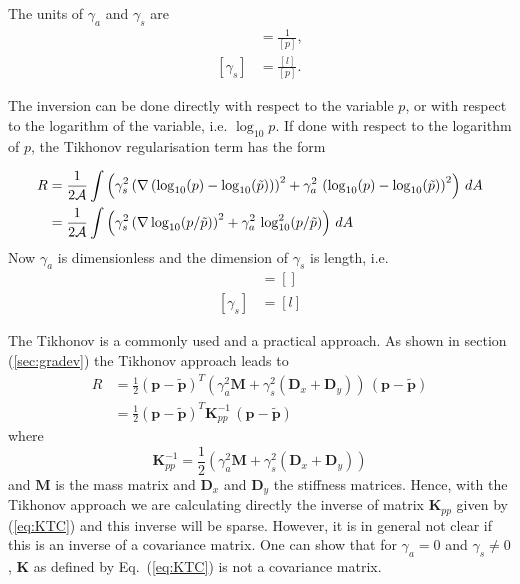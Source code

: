 \documentclass[10pt,a4paper]{book}
\begin{document}
The units of $\gamma_a$ and $\gamma_s$ are 
\begin{align*}
[\gamma_a] &= \frac{1}{[p]} , \\
[\gamma_s] &= \frac{[l]}{[p]}  .
\end{align*}

The inversion can be done directly with respect to the variable $p$,
or with respect to the logarithm of the variable, i.e.  $\log_{10}
p$. If done with respect to the logarithm of $p$, the Tikhonov
regularisation term has the form

\begin{align}
R & =  \frac{1}{2\cal{A}} \int \left ( \gamma_s^2   \left ( \nabla \left ( \log_{10}(p) - \log_{10}(\tilde{p}) \right ) \right )^2 + \gamma_a^2 \, \left (\log_{10}(p)-\log_{10}(\tilde{p}) \right )^2 \right ) \, dA \nonumber \\
  & =  \frac{1}{2\cal{A}} \int \left ( \gamma_s^2  \left ( \nabla   \log_{10}(p/\tilde{p}) \right )^2   + \gamma_a^2 \,  \log_{10}^2(p/\tilde{p})  \right ) \, dA 
\label{eq:TRlog1}
\end{align}
Now $\gamma_a$ is dimensionless and the dimension of $\gamma_s$ is length, i.e. 
\begin{align*}
[\gamma_a] &= [] \\
[\gamma_s] &= [l]
\end{align*}





The Tikhonov is a commonly used and a practical approach. As shown in
section (\ref{sec:gradev}) the Tikhonov approach leads to
\begin{align}
R  &= \frac{1}{2} (\bm{p}-\tilde{\bm{p}})^T \left ( \gamma_a^2 \bm{M}  +  \gamma_s^2 (\bm{D}_x + \bm{D}_y) \right ) \, ( \bm{p}-\tilde{\bm{p}}) \\
   &= \frac{1}{2} (\bm{p}-\tilde{\bm{p}})^T \bm{K}^{-1}_{pp} \, ( \bm{p}-\tilde{\bm{p}})
\end{align}
where
\begin{equation}
\bm{K}^{-1}_{pp} = \frac{1}{2}  \left ( \gamma_a^2 \bm{M} +  \gamma^2_s(\bm{D}_x + \bm{D}_y) \right )
\label{eq:KTC}
\end{equation}
and $\bm{M}$ is the mass matrix and $\bm{D}_x$ and $\bm{D}_y$ the
stiffness matrices. Hence, with the Tikhonov approach we are
calculating directly the inverse of matrix $\bm{K}_{pp}$ given by
(\ref{eq:KTC}) and this inverse will be sparse. However, it is in
general not clear if this is an inverse of a covariance matrix. One
can show that for $\gamma_a=0$ and $\gamma_s\neq 0$, $\bm{K}$ as
defined by Eq.~(\ref{eq:KTC}) is not a covariance matrix.  
\end{document}
